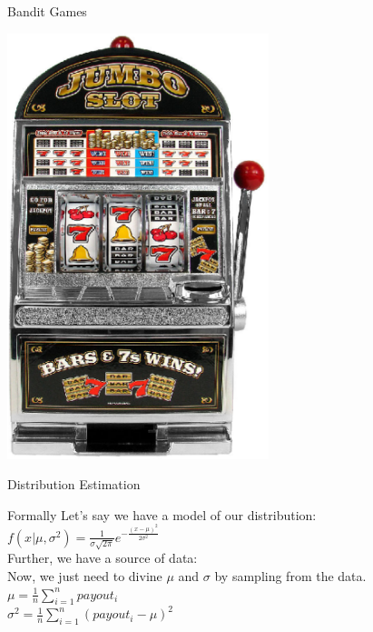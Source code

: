 \documentclass{powerdot}
\begin{document}
\begin{slide}{Bandit Games}

  \includegraphics[width=3in]{images/one-armed-bandit.eps}

\end{slide}

\begin{slide}{Distribution Estimation}
\end{slide}

\begin{slide}{Formally}
  Let's say we have a model of our distribution:\\
  $ f(x | \mu, \sigma^2)= \frac{1}{\sigma \sqrt{2\pi}} e^{-
    \frac{(x-\mu)^2}{2\sigma^2}}$\\
  Further, we have a source of data:\\ %

  Now, we just need to divine $\mu$ and $\sigma$ by sampling from the data.\\ %

  $\mu = \frac{1}{n} \sum_{i=1}^{n} payout_i$\\
  $\sigma^2 = \frac{1}{n} \sum_{i=1}^{n} (payout_i - \mu)^2$
\end{slide}
\end{document}

